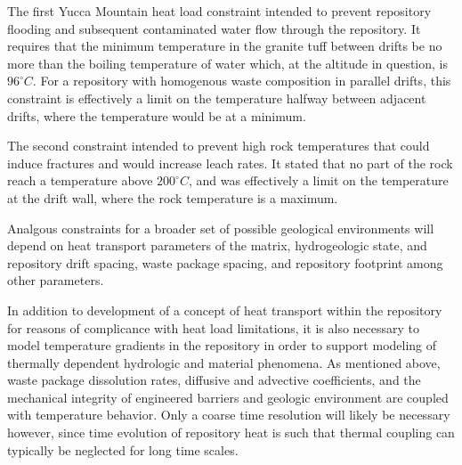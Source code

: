 The first Yucca Mountain heat load constraint intended to prevent repository 
flooding and subsequent contaminated water flow through the repository. It 
requires that the minimum temperature in the granite tuff between drifts be no  
more than the boiling temperature of water which, at the altitude in 
question, is $96^{\circ}C$. For a repository with homogenous waste composition 
in parallel drifts, this constraint is effectively a limit on the 
temperature halfway between adjacent drifts, where the temperature 
would be at a minimum.

The second constraint intended to prevent high rock temperatures that 
could induce fractures and would increase leach rates. It stated that no 
part of the rock reach a temperature above $200^{\circ}C$, and was 
effectively a limit on the temperature at the drift wall, where the 
rock temperature is a maximum.  

Analgous constraints for a broader set of possible geological 
environments will depend on heat transport parameters of the matrix, 
hydrogeologic state, and repository drift spacing, waste package 
spacing, and repository footprint among other parameters. 


In addition to development of a concept of heat transport within the 
repository for reasons of complicance with heat load limitations, it 
is also necessary to model temperature gradients in the repository in  
order to support modeling of thermally dependent hydrologic and material 
phenomena.  As mentioned above, waste package dissolution rates, diffusive and 
advective coefficients, and the mechanical integrity of engineered barriers 
and geologic environment are coupled with temperature behavior. Only a coarse 
time resolution will likely be necessary however, since time evolution of 
repository heat is such that thermal coupling can typically be neglected for 
long time scales.
\cite{andra_argile:_2005} %



